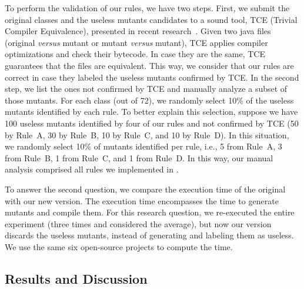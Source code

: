 To perform the validation of our rules, we have two steps. 
First, we submit the original classes and the useless mutants candidates to a sound tool, TCE (Trivial Compiler Equivalence), presented in recent research~\cite{KINTIS:2017:1}.
Given two java files (original \textit{versus} mutant or mutant \textit{versus} mutant), TCE applies compiler optimizations and check their bytecode. 
In case they are the same, TCE guarantees that the files are equivalent. 
This way, we consider that our rules are correct in case they labeled the useless mutants confirmed by TCE. 
In the second step, we list the ones not confirmed by TCE and manually analyze a subset of those mutants. 
For each class (out of 72), we randomly select 10\% of the useless mutants identified by each rule. 
To better explain this selection, suppose we have 100 useless mutants identified by four of our rules and not confirmed by TCE (50 by Rule~A, 30 by Rule~B, 10 by Rule~C, and 10 by Rule~D). 
In this situation, we randomly select 10\% of mutants identified per rule, i.e., 5 from Rule~A, 3 from Rule~B, 1 from Rule~C, and 1 from Rule~D. 
In this way, our manual analysis comprised all rules we implemented in \mujava{}.

To answer the second question, we compare the execution time of the original \mujava{} with our new \mujava{} version. 
The execution time encompasses the time to generate mutants and compile them. 
For this research question, we re-executed the entire experiment (three times and considered the average), but now our \mujava{} version discards the useless mutants, instead of generating and labeling them as useless. 
We use the same six open-source projects to compute the time.


\subsection{Results and Discussion}
\label{sec:evaluation-results}


